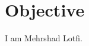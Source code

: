 \documentclass[../main.tex]{subfiles}
\begin{document}
\section{Objective}
\begin{category}
    \citembullet I am Mehrshad Lotfi.
\end{category}
\end{document}
